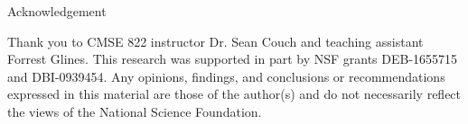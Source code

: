 \begin{block}{Acknowledgement}
{\footnotesize
Thank you to CMSE 822 instructor Dr. Sean Couch and teaching assistant Forrest Glines.
This research was supported in part by NSF grants DEB-1655715
and DBI-0939454.
Any opinions, findings, and conclusions or recommendations expressed in this
material are those of the author(s) and do not necessarily reflect the views of the National Science Foundation.\par
}
\end{block}

